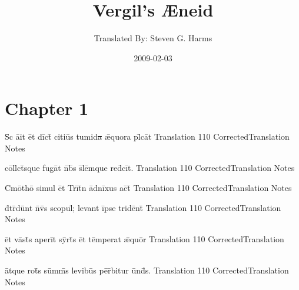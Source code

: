 \documentclass[]{book}
\title{Vergil's {\AE}neid}
\author{ Translated By:  Steven G. Harms }
\date{2009-02-03}
\begin{document}

\ifpdf
{}
\else
{}
\fi

\enumstyle 

\maketitle
\tableofcontents

\chapter{Chapter 1}







\latline
  {S\={\macron {\i}}c \={ai}t \=et d\=ict\={} c\-it\-i\=us t\-um\-id\sout{a }\={\ae}qu\-or\-a pl\={}c\=at}
  { Translation }
  {110}
  { CorrectedTranslation }
  { Notes }


\latline
  {c\=oll\={}ct\={}squ\-e f\-ug\=at n\={}b\={}s s\={}l\=emqu\-e r\-ed\={}c\=it.}
  { Translation }
  {110}
  { CorrectedTranslation }
  { Notes }


\latline
  {C\={}m\=otho\={} s\-im\-ul \=et Tr\={\i}t\={}n \=adn\=ix\-us \-ac\={}t\={}}
  { Translation }
  {110}
  { CorrectedTranslation }
  { Notes }

\latline
  {d\={}tr\={}d\=unt n\={}v\={\macron {\i}}s sc\-op\-ul\={}; l\-ev\-ant \=ips\-e tr\-id\=ent\={\macron {\i}}}
  { Translation }
  {110}
  { CorrectedTranslation }
  { Notes }


\latline
  {\=et v\=ast\={}s \-ap\-er\=it s\=yrt\={\macron {\i}}s \=et t\=emp\-er\-at \={\ae}qu\=or}
  { Translation }
  {110}
  { CorrectedTranslation }
  { Notes }


\latline
  {\=atqu\-e r\-ot\={\macron {\i}}s s\=umm\={}s l\-ev\-ib\=us p\=er\={}b\-it\-ur \=und\={}s.}
  { Translation }
  {110}
  { CorrectedTranslation }
  { Notes }
\end{document}
